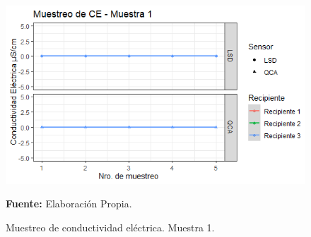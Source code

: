     \begin{figure}[H]
        \centering
        \includegraphics[width=0.75\linewidth]{Imagenes/cap4/CE_M1.png}
        \caption {Muestreo de conductividad el\'ectrica.  Muestra 1. }{\textbf{Fuente:}
        Elaboraci\'on Propia. }
        \label{fig:M1CE}
    \end{figure}

